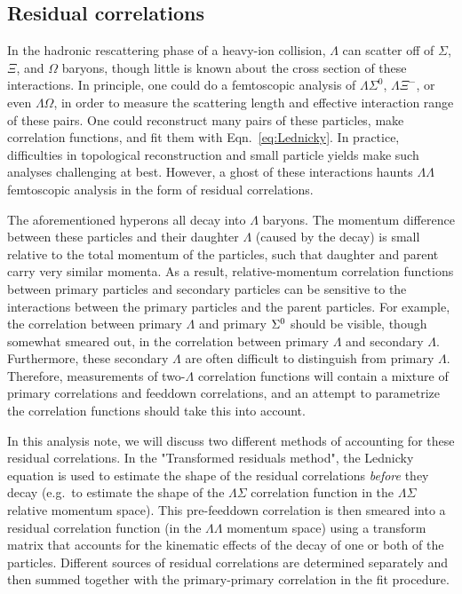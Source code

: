 \subsection{Residual correlations}
\label{sec:Residual}

In the hadronic rescattering phase of a heavy-ion collision, $\Lambda$ can scatter off of $\Sigma$, $\Xi$, and $\Omega$ baryons, though little is known about the cross section of these interactions.  
In principle, one could do a femtoscopic analysis of $\Lambda\Sigma^0$, $\Lambda\Xi^{-}$, or even $\Lambda\Omega$, in order to measure the scattering length and effective interaction range of these pairs. 
One could reconstruct many pairs of these particles, make correlation functions, and fit them with Eqn.\ \ref{eq:Lednicky}.
In practice, difficulties in topological reconstruction and small particle yields make such analyses challenging at best.
However, a ghost of these interactions haunts $\Lambda\Lambda$ femtoscopic analysis in the form of residual correlations.

The aforementioned hyperons all decay into $\Lambda$ baryons.  
The momentum difference between these particles and their daughter $\Lambda$ (caused by the decay) is small relative to the total momentum of the particles, such that daughter and parent carry very similar momenta.  
As a result, relative-momentum correlation functions between primary particles and secondary particles can be sensitive to the interactions between the primary particles and the parent particles.  
For example, the correlation between primary $\Lambda$ and primary $\Sigma^{\rm 0}$ should be visible, though somewhat smeared out, in the correlation between primary $\Lambda$ and secondary $\Lambda$.  
Furthermore, these secondary $\Lambda$ are often difficult to distinguish from primary $\Lambda$.  
Therefore, measurements of two-$\Lambda$ correlation functions will contain a mixture of primary correlations and feeddown correlations, and an attempt to parametrize the correlation functions should take this into account.  

In this analysis note, we will discuss two different methods of accounting for these residual correlations.  
In the "Transformed residuals method", the Lednicky equation is used to estimate the shape of the residual correlations \emph{before} they decay (e.g.\ to estimate the shape of the $\Lambda\Sigma$ correlation function in the $\Lambda\Sigma$ relative momentum space).  
This pre-feeddown correlation is then smeared into a residual correlation function (in the $\Lambda\Lambda$ momentum space) using a transform matrix that accounts for the kinematic effects of the decay of one or both of the particles.  
Different sources of residual correlations are determined separately and then summed together with the primary-primary correlation in the fit procedure.

